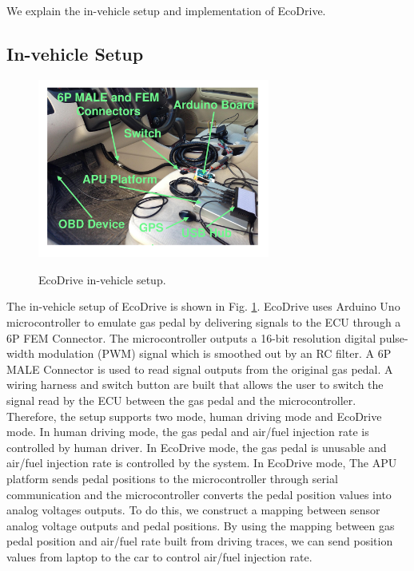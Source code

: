 
We explain the in-vehicle setup and implementation of EcoDrive.


\subsection{In-vehicle Setup}


\begin{figure}[t]
\begin{center}
\includegraphics[width=3.0in,angle=0]{Figs/EcoDrive/setup_3.pdf}
\vspace{-0.3cm}
\caption{EcoDrive in-vehicle setup.}
\vspace{-0.6cm}
\label{setup}
\end{center}
\end{figure}


The in-vehicle setup of EcoDrive is shown in Fig. \ref{setup}. 
EcoDrive uses Arduino Uno microcontroller to emulate 
gas pedal by delivering signals to the ECU through a 6P FEM Connector. 
The microcontroller outputs a 16-bit resolution digital pulse-width modulation (PWM) 
signal which is smoothed out by an RC filter. 
A 6P MALE Connector is used to read signal outputs from 
the original gas pedal. 
A wiring harness and switch button are built that allows the user 
to switch the signal read by the ECU between the gas pedal and 
the microcontroller.  
Therefore, the setup supports two mode, human driving mode and
EcoDrive mode. 
In human driving mode, the gas pedal and air/fuel injection rate
is controlled by human driver.
In EcoDrive mode, the gas pedal is unusable and air/fuel injection rate
is controlled by the system. 
In EcoDrive mode, The APU platform \cite{apu} sends pedal positions to the microcontroller through 
serial communication and the microcontroller converts the pedal position values 
into analog voltages outputs. 
To do this, we construct a mapping between sensor analog 
voltage outputs and pedal positions. 
By using the mapping between gas pedal position
and air/fuel rate built from driving traces, 
we can send position values from laptop to the car
to control air/fuel injection rate.  

